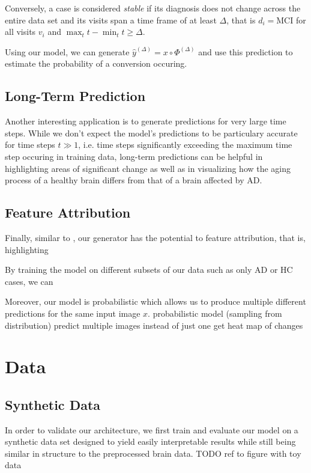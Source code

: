 Conversely, a case is considered \textit{stable} if its diagnosis does not change across the entire data set and its visits span a time frame of at least $\Delta$, that is $ d_i = \text{MCI} $ for all visits $v_i$ and $ { \max_{t} t -  \min_{t} t \geq \Delta } $.

Using our model, we can generate $\hat y^{(\Delta)} = x \circ \Phi^{(\Delta)}$ and use this prediction to estimate the probability of a conversion occuring.

\section{Long-Term Prediction}
Another interesting application is to generate predictions for very large time steps. While we don't expect the model's predictions to be particulary accurate for time steps $t \gg 1$, i.e. time steps significantly exceeding the maximum time step occuring in training data, long-term predictions can be helpful in highlighting areas of significant change as well as in visualizing how the aging process of a healthy brain differs from that of a brain affected by AD.

\section{Feature Attribution}
Finally, similar to \cite{baumgartner2018visual}, our generator has the potential to feature attribution, that is, highlighting 

By training the model on different subsets of our data such as only AD or HC cases, we can 

Moreover, our model is probabilistic which allows us to produce multiple different predictions for the same input image $x$.
probabilistic model (sampling from distribution)
predict multiple images instead of just one
get heat map of changes

\chapter{Data}

\section{Synthetic Data} \label{sec:synth}
In order to validate our architecture, we first train and evaluate our model on a synthetic data set designed to yield easily interpretable results while still being similar in structure to the preprocessed brain data. TODO ref to figure with toy data

